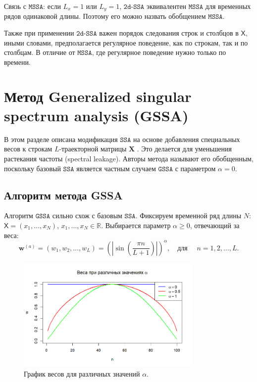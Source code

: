 \documentclass[12pt, specialist, subf
]{disser}
\theoremstyle{definition}
\newcommand{\SSA}{\texttt{SSA}}
\newcommand{\GSSA}{\texttt{GSSA}}
\newcommand{\MSSA}{\texttt{MSSA}}
\newcommand{\DSSA}{\texttt{2d-SSA}}
\newcommand{\TS}{\mathsf{X}}
\begin{document}
{Связь с $\MSSA$:} если $L_x = 1$ или $L_y = 1$, $\DSSA$ эквивалентен $\MSSA$ для временных рядов одинаковой длины. Поэтому его можно назвать обобщением $\MSSA$.

Также при применении $\DSSA$ важен порядок следования строк и столбцов в $\TS$, иными словами, предполагается регулярное поведение, как по строкам, так и по столбцам. В отличие от $\MSSA$, где регулярное поведение нужно только по времени.



\newpage




\chapter{Метод Generalized singular spectrum analysis (GSSA)}
\label{sec:gssa}

В этом разделе описана модификация $\SSA$ на основе добавления специальных весов к строкам $L$-траекторной матрицы $\mathbf{X}$ \cite{gu2024generalized}. Это делается для уменьшения растекания частоты (spectral leakage). Авторы метода называют его обобщенным, поскольку базовый $\SSA$ является частным случаем $\GSSA$ с параметром $\alpha = 0$.

\section{Алгоритм метода GSSA}
Алгоритм $\GSSA$ сильно схож с базовым $\SSA$. Фиксируем временной ряд длины $N$: $\TS = (x_1, \dots, x_{N})$, $x_1, \dots, x_{N} \in \mathbb{R}$. Выбирается параметр $\alpha \geq 0$, отвечающий за веса:
\begin{equation*}
	{\boldsymbol{w}}^{(a)} = (w_{1}, w_{2}, \ldots, w_{L}) = \left( \left| \sin\left(\frac{\pi n}{L+1}\right) \right| \right)^\alpha, \quad \text{для } \quad n = 1, 2, \dots, L.
\end{equation*}

\begin{figure}[h]
	\centering
	\includegraphics[width=0.8\textwidth]{img/weights.png} %
	\caption{График весов для различных значений \(\alpha\).} %
	\label{fig:weights} %
\end{figure}
\end{document}

